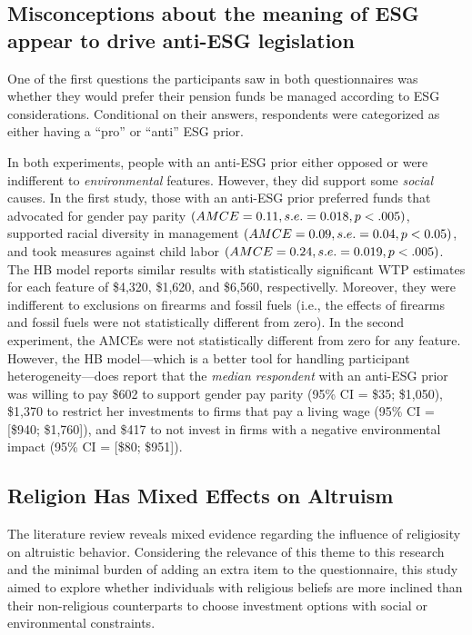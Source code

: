 \documentclass[
  12pt,
]{article}
\begin{document}
\hypertarget{misconceptions-about-the-meaning-of-esg-appear-to-drive-anti-esg-legislation}{%
\subsection{Misconceptions about the meaning of ESG appear to drive anti-ESG legislation}\label{misconceptions-about-the-meaning-of-esg-appear-to-drive-anti-esg-legislation}}

One of the first questions the participants saw in both questionnaires was whether they would prefer their pension funds be managed according to ESG considerations. Conditional on their answers, respondents were categorized as either having a ``pro'' or ``anti'' ESG prior.

In both experiments, people with an anti-ESG prior either opposed or were indifferent to \emph{environmental} features. However, they did support some \emph{social} causes. In the first study, those with an anti-ESG prior preferred funds that advocated for gender pay parity \((AMCE = 0.11, \space s.e.=0.018, \space p <.005)\), supported racial diversity in management \((AMCE = 0.09, \space s.e.=0.04, \space p <0.05)\), and took measures against child labor \((AMCE = 0.24, \space s.e.=0.019, \space p <.005)\). The HB model reports similar results with statistically significant WTP estimates for each feature of \$4,320, \$1,620, and \$6,560, respectivelly. Moreover, they were indifferent to exclusions on firearms and fossil fuels (i.e., the effects of firearms and fossil fuels were not statistically different from zero). In the second experiment, the AMCEs were not statistically different from zero for any feature. However, the HB model---which is a better tool for handling participant heterogeneity---does report that the \emph{median respondent} with an anti-ESG prior was willing to pay \$602 to support gender pay parity (95\% CI = \$35; \$1,050), \$1,370 to restrict her investments to firms that pay a living wage (95\% CI = {[}\$940; \$1,760{]}), and \$417 to not invest in firms with a negative environmental impact (95\% CI = {[}\$80; \$951{]}).

\hypertarget{religion-has-mixed-effects-on-altruism}{%
\subsection{Religion Has Mixed Effects on Altruism}\label{religion-has-mixed-effects-on-altruism}}

The literature review reveals mixed evidence regarding the influence of religiosity on altruistic behavior. Considering the relevance of this theme to this research and the minimal burden of adding an extra item to the questionnaire, this study aimed to explore whether individuals with religious beliefs are more inclined than their non-religious counterparts to choose investment options with social or environmental constraints.
\end{document}
